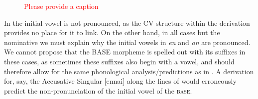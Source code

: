 \documentclass[output=paper]{langscibook}
\begin{document}
\begin{figure}
    \centering
    \begin{minipage}[t]{.3\textwidth}
    \end{minipage}
    \begin{minipage}[t]{.1\textwidth}
        \rightarrow 
    \end{minipage}
    \begin{minipage}[t]{.3\textwidth}
        \centering
        [nãã]
    \end{minipage}
    \caption{\textcolor{red}{\color{red}Please provide a caption}}
    \label{new17}
\end{figure}

In  the initial vowel is not pronounced, as the CV structure within the derivation provides no place for it to link. On the other hand, in all cases but the nominative we must explain why the initial vowels in \textit{en} and \textit{on} are pronounced. We cannot propose that the BASE morpheme is spelled out with its suffixes in these cases, as sometimes these suffixes also begin with a vowel, and should therefore allow for the same phonological analysis/predictions as in . A derivation for, say, the Accusative Singular [ennai] along the lines of  would erroneously predict the non-pronunciation of the initial vowel of the \textsc{base}.
\end{document}
